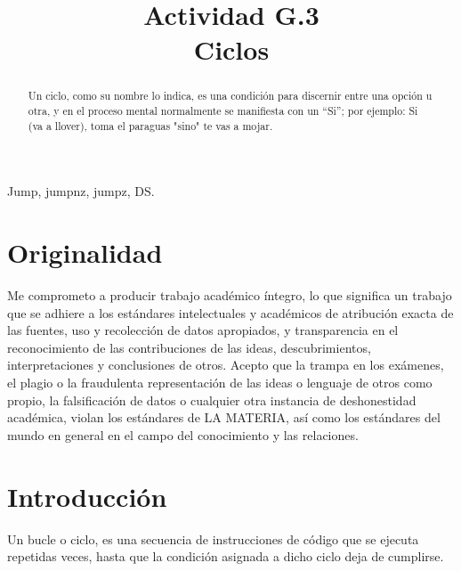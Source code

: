 \documentclass[conference]{IEEEtran}
\begin{document}
\title{Actividad G.3 \\Ciclos
}

\author{
}
\onecolumn

\maketitle

\begin{abstract}
Un ciclo, como su nombre lo indica, es una condición para discernir entre una opción u otra, y en el proceso mental normalmente se manifiesta con un “Si”; por ejemplo: Si (va a llover), toma el paraguas "sino" te vas a mojar.
\end{abstract}

\begin{IEEEkeywords}
\begin{center}
Jump, jumpnz, jumpz, DS.
\end{center}
\end{IEEEkeywords}

\section{Originalidad}
Me comprometo a producir trabajo académico íntegro, lo que significa un trabajo que se adhiere a los estándares intelectuales y académicos de atribución exacta de las fuentes, uso y recolección de datos apropiados, y transparencia en el reconocimiento de las contribuciones de las ideas, descubrimientos, interpretaciones y conclusiones de otros.
Acepto que la trampa en los exámenes, el plagio o la fraudulenta representación de las ideas o lenguaje de otros como propio, la falsificación de datos o cualquier otra instancia de deshonestidad académica, violan los estándares de LA MATERIA, así como los estándares del mundo en general en el campo del conocimiento y las relaciones.

\section{Introducción}
\begin{center}
Un bucle o ciclo, es una secuencia de instrucciones de código que se ejecuta repetidas veces, hasta que la condición asignada a dicho ciclo deja de cumplirse.
\end{center}
\end{document}
